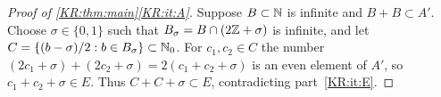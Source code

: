\begin{proof}[Proof of \cref{KR:thm:main}\ref{KR:it:A}]
Suppose $B\subset\mathbb{N}$ is infinite and $B+B\subset A'$. Choose $\sigma\in\{0,1\}$ such that
$B_\sigma=B\cap(2\mathbb{Z}+\sigma)$ is infinite, and let $C=\{(b-\sigma)/2:b\in B_\sigma\}\subset\mathbb{N}_0$. For
$c_1,c_2\in C$ the number $(2c_1+\sigma)+(2c_2+\sigma)=2(c_1+c_2+\sigma)$ is an even element of $A'$,
so $c_1+c_2+\sigma\in E$. Thus $C+C+\sigma\subset E$, contradicting part~\ref{KR:it:E}.
\end{proof}


